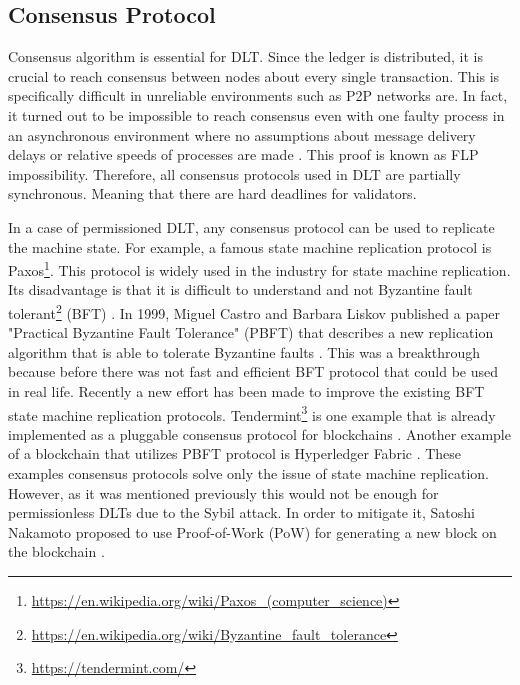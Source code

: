 \subsection{Consensus Protocol}
\label{consensus-algorithm-section}
\quad Consensus algorithm is essential for DLT. Since the ledger is distributed, it is crucial to reach consensus between nodes about every single transaction. This is specifically difficult in unreliable environments such as P2P networks are. In fact, it turned out to be impossible to reach consensus even with one faulty process in an asynchronous environment where no assumptions about message delivery delays or relative speeds of processes are made \cite{fischer_impossibility_1985}. This proof is known as FLP impossibility. Therefore, all consensus protocols used in DLT are partially synchronous. Meaning that there are hard deadlines for validators.

In a case of permissioned DLT, any consensus protocol can be used to replicate the machine state. For example, a famous state machine replication protocol is Paxos\footnote{\url{https://en.wikipedia.org/wiki/Paxos_(computer_science)}}. This protocol is widely used in the industry for state machine replication. Its disadvantage is that it is difficult to understand and not Byzantine fault tolerant\footnote{\url{https://en.wikipedia.org/wiki/Byzantine_fault_tolerance}} (BFT) \cite{buchman_tendermint:_2016}. %
In 1999, Miguel Castro and Barbara Liskov published a paper "Practical Byzantine Fault Tolerance" (PBFT) that describes a new replication algorithm that is able to tolerate Byzantine faults \cite{castro_practical_1999}. This was a breakthrough because before there was not fast and efficient BFT protocol that could be used in real life. Recently a new effort has been made to improve the existing BFT state machine replication protocols. Tendermint\footnote{\url{https://tendermint.com/}} is one example that is already implemented as a pluggable consensus protocol for blockchains \cite{buchman_tendermint:_2016}. Another example of a blockchain that utilizes PBFT protocol is Hyperledger Fabric \cite{cachin_architecture_2016}. These examples consensus protocols solve only the issue of state machine replication. However, as it was mentioned previously this would not be enough for permissionless DLTs due to the Sybil attack. In order to mitigate it, Satoshi Nakamoto proposed to use Proof-of-Work (PoW) for generating a new block on the blockchain \cite{nakamoto_bitcoin:_2008}.

